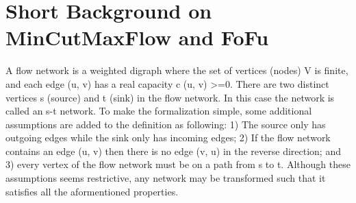 \documentclass{llncs}
\begin{document}
\section{Short Background on MinCutMaxFlow and FoFu}
\begin{comment}
  GOAL: 
    1) Remind the reader of FoFu. The educated reader should have the feeling:
      Yes, now I recall FoFu, and understand (again) what it does.
      
    2) Set the field for further, more detailed descriptions in next section.
  

  Short description of Network: Finite graph over nodes V, 
    edge (u,v) annotated with capacity c(u,v).
    Assuming distinct nodes s and t. 
    Note on additional assumptions: 
        No parallel edges, s only outgoing, t only incoming, all nodes on path from s to t. 
        Can transform any Network to match these assumptions, preserving the flow \cite{???}.
        
  s-t Flow: Annotation of edges with values, such that: 
    1) Values smaller than capacities.
    2) Kirchhoff law: sum of incoming flows = sum of outgoing flows, for all nodes except s t
  
  Value of flow: Incoming flow - outgoing flow of s
  
  Max-Flow problem. 
    Rpt. why important?
  
  Cuts, intuition of min-cut >= max-flow
  
  Theorem: Min-Cut = Max-Flow
  Proven via augmenting flow in residual graph. 
    Present 1,2,3 of min-cut max-flow equivalences
  
  This yields an algorithm to compute max-flows, if we can compute flows in residual graph.
    --> Simple way: Augmenting flow via augmenting path. ==> FoFu-scheme. 
      Termination? In General: Only for integer capacities.
      Edmonds-Karp: Shortest augmenting path. Always terminates! Complexity: O(|E||V|) outer loop iterations, BFS requires O|E|.
  \end{comment}
A flow network is a weighted digraph where the set of vertices (nodes) V is finite, and each edge (u, v) has a real capacity c (u, v) >=0. There are two distinct vertices s (source) and t (sink) in the flow network. In this case the network is called an s-t network. To make the formalization simple, some additional assumptions are added to the definition as following: 1) The source only has outgoing edges while the sink only has incoming edges; 2) If the flow network contains an edge (u, v) then there is no edge (v, u) in the reverse direction; and 3) every vertex of the flow network must be on a path from s to t. Although these assumptions seems restrictive, any network may be transformed such that it satisfies all the aformentioned properties.
\end{document}
